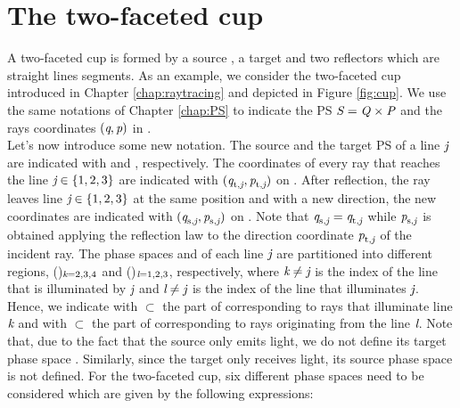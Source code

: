 \section{The two-faceted cup}
A two-faceted cup is formed by a source , a target  and two reflectors which are straight lines segments. 
As an example, we consider the two-faceted cup introduced in Chapter \ref{chap:raytracing} and depicted in Figure \ref{fig:cup}.
We use the same notations of Chapter \ref{chap:PS} to indicate the PS $\mbox{$\emph{S}_{\textit{}}$}=\mbox{$\emph{Q}_{\textit{}}$}\times\mbox{$\emph{P}_{\textit{}}$}$ and the rays coordinates 
$(\textit{q}, \textit{p})$ in .\\ \indent
Let's now introduce some new notation. 
The source and the target PS of a line $\textit{j}$ are indicated with  and , respectively.
The coordinates of every ray that reaches the line $\textit{j}\in\{1, 2, 3\}$ are indicated  with $(\textit{q}_{\textrm{t,} \textit{\textit{j}}}, \textit{p}_{\textrm{t,} \textit{\textit{j}}})$ on .
After reflection, the ray leaves line $\textit{j} \in\{1, 2, 3\}$ at the same position and with a new direction, the new coordinates are indicated with 
$(\textit{q}_{\textrm{s,} \textit{\textit{j}}}, \textit{p}_{\textrm{s,} \textit{\textit{j}}})$ on .
Note that $\textit{q}_{\textrm{s,} \textit{\textit{j}}}= \textit{q}_{\textrm{t,} \textit{\textit{j}}}$ while $\textit{p}_{\textrm{s,} \textit{\textit{j}}}$ is obtained applying the reflection law to the direction coordinate $\textit{p}_{\textrm{t,} \textit{\textit{j}}}$ of the incident ray.
The phase spaces  and   of each line $\textit{j}$ are partitioned into different regions, ()$_{\textit{k}=2, 3, 4}$ and ()$_{\textit{l}=1, 2, 3}$, respectively, where $\textit{k}\neq \textit{j}$ is the index of the line that is illuminated by $\textit{j}$ and $\textit{l}\neq\textit{j}$ is the index of the line that illuminates $\textit{j}$. Hence, we indicate with $\subset$  the part of  corresponding to rays that illuminate line $\textit{k}$ and with  $\subset$  the part of  corresponding to rays originating from the line $\textit{l}$. Note that, due to the fact that the source only emits light, we do not define its target phase space . Similarly, since the target only receives light, its source phase space  is not defined.
For the two-faceted cup, six different phase spaces need to be considered which are given by the following expressions:
